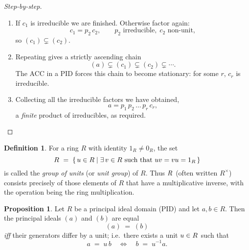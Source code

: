 \documentclass[12pt]{article}
\theoremstyle{definition} %
\newtheorem{proposition}{Proposition}
\newtheorem{definition}{Definition}
\theoremstyle{plain} %
\begin{document}
\begin{proof}[Step-by-step]
\begin{enumerate}[label=\textbf{Part \arabic*:}, leftmargin=1.5em]
\begin{enumerate}[label=\arabic*. , leftmargin=2em]
                  \item If $c_{1}$ is irreducible we are finished.
                        Otherwise factor again:
                        \[
                            c_{1} = p_{2}\,c_{2},
                            \qquad p_{2}\text{ irreducible},
                            \;c_{2}\text{ non-unit},
                        \]
                        so $(c_{1}) \subsetneq (c_{2})$.

                  \item Repeating gives a strictly ascending chain
                        \[
                            (a) \subsetneq (c_{1}) \subsetneq (c_{2})
                            \subsetneq \cdots .
                        \]
                        The ACC in a PID forces this chain to become
                        stationary: for some $r$, $c_{r}$ is irreducible.

                  \item Collecting all the irreducible factors we have
                        obtained,
                        \[
                            a = p_{1}\,p_{2}\,\dots\,p_{r}\,c_{r},
                        \]
                        a \emph{finite} product of irreducibles, as
                        required.
              \end{enumerate}

    \end{enumerate}
\end{proof}
\begin{definition}
  For a ring $R$ with identity $1_R\neq 0_R$, the set
  \[
      R^{\*}\;=\;\{\,u\in R \mid \exists\,v\in R\text{ such that }uv=vu=1_R\,\}
  \]
  is called the \emph{group of units} (or \emph{unit group}) of $R$.
  Thus $R^{\*}$ (often written $R^{\times}$) consists precisely of
  those elements of $R$ that have a multiplicative inverse, with the
  operation being the ring multiplication.
\end{definition}
\begin{proposition}
  Let $R$ be a principal ideal domain (PID) and let 
  $a,b\in R$.  
  Then the principal ideals $(a)$ and $(b)$ are equal
  \[
      (a) \;=\; (b)
  \]
  \emph{iff} their generators differ by a unit; i.e.\ there exists a
  unit $u\in R^{\*}$ such that
  \[
      a \;=\; u\,b
      \quad\Longleftrightarrow\quad
      b \;=\; u^{-1}a .
  \]
\end{proposition}
\end{document}
